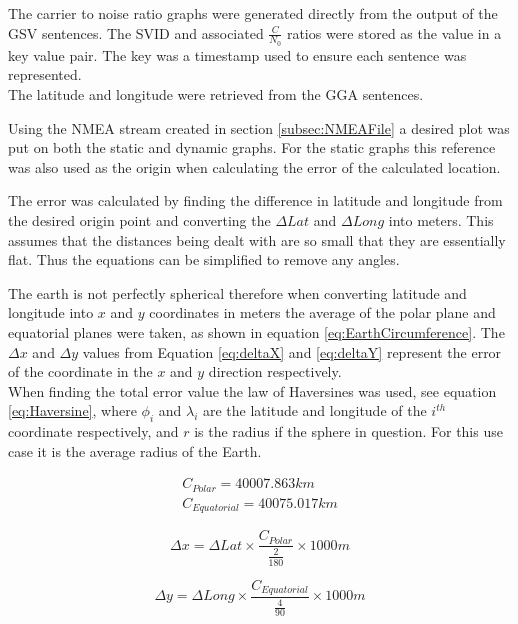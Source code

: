 The carrier to noise ratio graphs were generated directly from the output of the GSV sentences. The SVID and associated $\frac{C}{N_0}$ ratios were stored as the value in
a key value pair. The key was a timestamp used to ensure each sentence was represented.\\
The latitude and longitude were retrieved from the GGA sentences.

Using the NMEA stream created in section \ref{subsec:NMEAFile} a desired plot was put on both the static and dynamic graphs. For the static graphs this reference was also
used as the origin when calculating the error of the calculated location.

The error was calculated by finding the difference in latitude and longitude from the desired origin point and converting the $\Delta Lat$ and $\Delta Long$ into meters.
This assumes that the distances being dealt with are so small that they are essentially flat. Thus the equations can be simplified to remove any angles.

The earth is not perfectly spherical therefore when converting latitude and longitude into $x$ and $y$ coordinates in meters the average of the polar plane and equatorial
planes were taken, as shown in equation \ref{eq:EarthCircumference}. The $\Delta x$ and $\Delta y$ values from Equation \ref{eq:deltaX} and \ref{eq:deltaY} represent
the error of the coordinate in the $x$ and $y$ direction respectively. \\
When finding the total error value the law of Haversines was used, see equation \ref{eq:Haversine}, where $\phi_i$ and $\lambda_i$ are the latitude and longitude of the
$i^{th}$ coordinate respectively, and $r$ is the radius if the sphere in question. For this use case it is the average radius of the Earth.  

\begin{equation} 
    \begin{split} \label{eq:EarthCircumference}
        C_{Polar} = 40007.863 km \\ 
        C_{Equatorial} = 40075.017 km
    \end{split}
\end{equation}

\begin{equation} \label{eq:deltaX}
    \Delta x = \Delta Lat \times \frac{C_{Polar}}{\frac{2}{180}} \times 1000 m
\end{equation}

\begin{equation} \label{eq:deltaY}
    \Delta y = \Delta Long \times \frac{C_{Equatorial}}{\frac{4}{90}} \times 1000 m
\end{equation}

